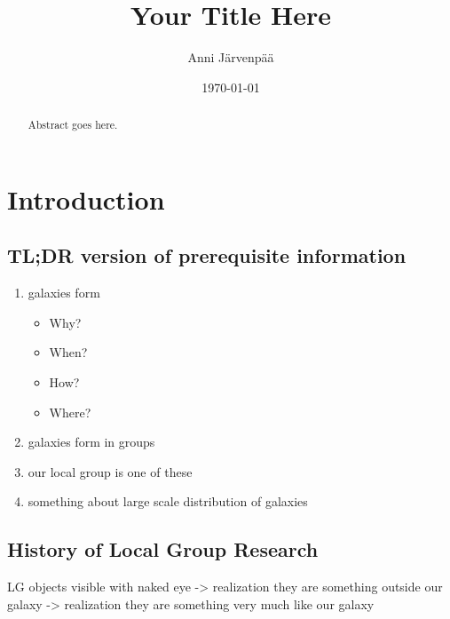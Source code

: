 \documentclass[english, oneside]{HYgradu}
\title{Your Title Here}
\author{Anni Järvenpää}
\date{\today}
\begin{document}
\maketitle

\begin{abstract}
Abstract goes here.
\end{abstract}

\mytableofcontents



\chapter{Introduction}

\section{TL;DR version of prerequisite information}
\begin{enumerate}
	\item galaxies form
	\begin{itemize}
		\item Why?
		\item When?
		\item How?
		\item Where?
	\end{itemize}
	\item galaxies form in groups
	\item our local group is one of these
	\item something about large scale distribution of galaxies
\end{enumerate}

\section{History of Local Group Research}
LG objects visible with naked eye -> realization they are something outside our galaxy -> realization they are something very much like our galaxy
\end{document}
